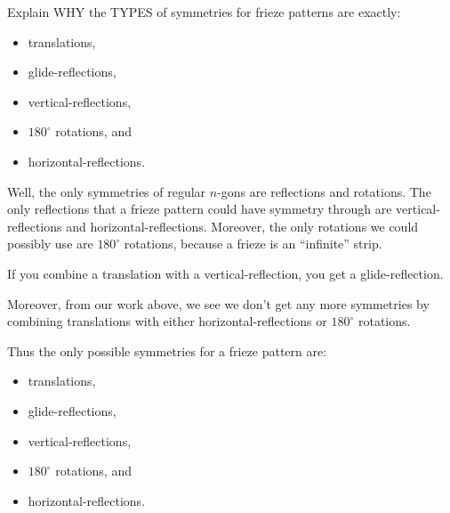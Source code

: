 \documentclass[noauthor,nooutcomes,hints,handout]{ximera}
\begin{document}
\begin{question}
  Explain WHY the TYPES of symmetries for frieze patterns are
  exactly:
  \begin{itemize}
  \item translations,
  \item glide-reflections,
  \item vertical-reflections,
  \item $180^\circ$ rotations, and
  \item horizontal-reflections.
  \end{itemize}
  \begin{freeResponse}
    Well, the only symmetries of regular $n$-gons are reflections and
    rotations. The only reflections that a frieze pattern could have
    symmetry through are vertical-reflections and
    horizontal-reflections. Moreover, the only rotations we could
    possibly use are $180^\circ$ rotations, because a frieze is an
    ``infinite'' strip.

    If you combine a translation with a vertical-reflection, you get a
    glide-reflection.

    Moreover, from our work above, we see we don't get any more
    symmetries by combining translations with either
    horizontal-reflections or $180^\circ$ rotations.

    Thus the only possible symmetries for a frieze pattern are:
    \begin{itemize}
    \item translations,
    \item glide-reflections,
    \item vertical-reflections,
    \item $180^\circ$ rotations, and
    \item horizontal-reflections.
    \end{itemize}
  \end{freeResponse}
\end{question}
\end{document}
